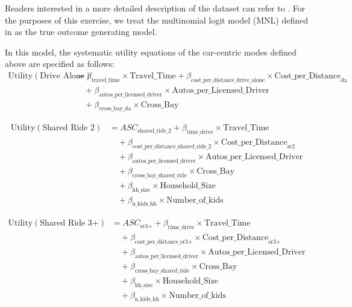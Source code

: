 Readers interested in a more detailed description of the dataset can refer to \citet{brathwaite_asymmetric}.
For the purposes of this exercise, we treat the multinomial logit model (MNL) defined in \citet{brathwaite_asymmetric} as the true outcome generating model.

In this model, the systematic utility equations of the car-centric modes defined above are specified as follows:
\begin{equation}
   \begin{aligned}
   \label{eq:DA}
   \textrm{Utility} \left(\textrm{Drive Alone}\right) &= \beta_{\textrm{travel\_time}} \times \textrm{Travel\_Time} + \beta_{\textrm{cost\_per\_distance\_drive\_alone}} \times \textrm{Cost\_per\_Distance}_{\textrm{da}} \\
   &\quad + \beta_{\textrm{autos\_per\_licensed\_driver}} \times \textrm{Autos\_per\_Licensed\_Driver} \\
   &\quad + \beta_{\textrm{cross\_bay\_da}} \times \textrm{Cross\_Bay}
   \end{aligned}
\end{equation}

\begin{equation}
   \begin{aligned}
   \label{eq:SR2}
   \textrm{Utility} \left(\textrm{Shared Ride 2}\right) &= ASC_{\textrm{shared\_ride\_2}} + \beta_{\textrm{time\_drive}} \times \textrm{Travel\_Time} \\
   &\quad + \beta_{\textrm{cost\_per\_distance\_shared\_ride\_2}} \times \textrm{Cost\_per\_Distance}_{ \textrm{sr2} } \\
   &\quad + \beta_{\textrm{autos\_per\_licensed\_driver}}  \times \textrm{Autos\_per\_Licensed\_Driver} \\
   &\quad + \beta_{\textrm{cross\_bay\_shared\_ride}} \times \textrm{Cross\_Bay} \\
   &\quad + \beta_{\textrm{hh\_size}} \times \textrm{Household\_Size} \\
   &\quad + \beta_{\textrm{n\_kids\_hh}} \times \textrm{Number\_of\_kids}
   \end{aligned}
\end{equation}

\begin{equation}
   \begin{aligned}
   \label{eq:SR3+}
   \textrm{Utility} \left(\textrm{Shared Ride 3+}\right) &= ASC_{\textrm{sr3+}} + \beta_{\textrm{time\_drive}} \times \textrm{Travel\_Time} \\
   &\quad + \beta_{\textrm{cost\_per\_distance\_sr3+}} \times \textrm{Cost\_per\_Distance}_{\textrm{sr3+}} \\
   &\quad + \beta_{\textrm{autos\_per\_licensed\_driver}}  \times \textrm{Autos\_per\_Licensed\_Driver} \\
   &\quad + \beta_{\textrm{cross\_bay\_shared\_ride}} \times \textrm{Cross\_Bay} \\
   &\quad + \beta_{\textrm{hh\_size}} \times \textrm{Household\_Size} \\
   &\quad + \beta_{\textrm{n\_kids\_hh}} \times \textrm{Number\_of\_kids}
   \end{aligned}
\end{equation}

